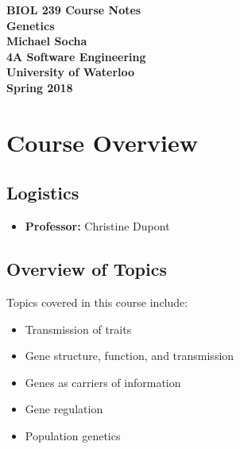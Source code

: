 \documentclass[12pt,titlepage]{article}
\begin{document}
  \begin{titlepage}
    \vspace*{\fill}
    \centering

    \textbf{\Huge BIOL 239 Course Notes} \\ [0.4em]
    \textbf{\Large Genetics} \\ [1em]
    \textbf{\Large Michael Socha} \\ [1em]
    \textbf{\large 4A Software Engineering} \\
    \textbf{\large University of Waterloo} \\
    \textbf{\large Spring 2018} \\
    \vspace*{\fill}
  \end{titlepage}

  \newpage 


  \tableofcontents

  \newpage


  \section{Course Overview}
    \subsection{Logistics}
      \begin{itemize}
        \item \textbf{Professor:} Christine Dupont
      \end{itemize}

    \subsection{Overview of Topics}
      Topics covered in this course include:
      \begin{itemize}
        \item Transmission of traits
        \item Gene structure, function, and transmission
        \item Genes as carriers of information
        \item Gene regulation
        \item Population genetics
      \end{itemize}

  \newpage
\end{document}
